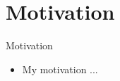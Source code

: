 \section{Motivation}

\begin{frame}{Motivation}
  \begin{itemize}
    \item My motivation ...
  \end{itemize}
\end{frame}


